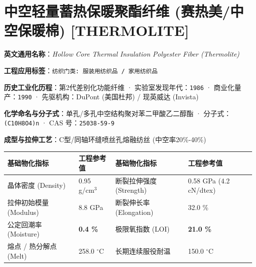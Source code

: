 \documentclass[11pt,openright,twoside,UTF8]{ctexbook}
\begin{document}
\section{中空轻量蓄热保暖聚酯纤维 (赛热美/中空保暖棉) [THERMOLITE]}
\label{sec:thermolite}

\noindent\textbf{英文通用名称}：\textit{Hollow Core Thermal Insulation Polyester Fiber (Thermolite)}\par
\noindent\textbf{工程应用标签}：\texttt{纺织门类: 服装用纺织品 / 家用纺织品}\par
\noindent\textbf{历史工业化历程}：第2代差别化功能纤维 · 实验室发现年代：\texttt{1986} · 商业化量产：\texttt{1990} · 先驱机构：DuPont (美国杜邦) / 现英威达 (Invista)\par
\noindent\textbf{化学命名与分子式}：单孔/多孔中空结构聚对苯二甲酸乙二醇酯 · 分子式：\texttt{(C10H8O4)n} · CAS 号：\texttt{25038-59-9}\par
\noindent\textbf{成型与拉伸工艺}：C型/同轴环缝喷丝孔熔融纺丝 (中空率20\%-40\%)\par

\vspace{0.15cm}
\begin{center}
\small
\begin{tabularx}{\textwidth}{p{3.8cm}Xp{3.8cm}X}
\toprule
\textbf{基础物化指标} & \textbf{工程参考值} & \textbf{基础物化指标} & \textbf{工程参考值} \\
\midrule
晶体密度 (Density) & 0.95 g/cm$^3$ & 断裂拉伸强度 (Strength) & 0.58 GPa (4.2 cN/dtex) \\
拉伸初始模量 (Modulus) & 8.8 GPa & 断裂伸长率 (Elongation) & 32.0 \% \\
公定回潮率 (Moisture) & \textbf{0.4 \%} & 极限氧指数 (LOI) & \textbf{21.0 \%} \\
熔点 / 热分解点 (Melt) & 258.0 $^\circ\mathrm{C}$ & 长期连续服役耐温 & 150.0 $^\circ\mathrm{C}$ \\
\bottomrule
\end{tabularx}
\end{center}
\vspace{0.15cm}
\end{document}

